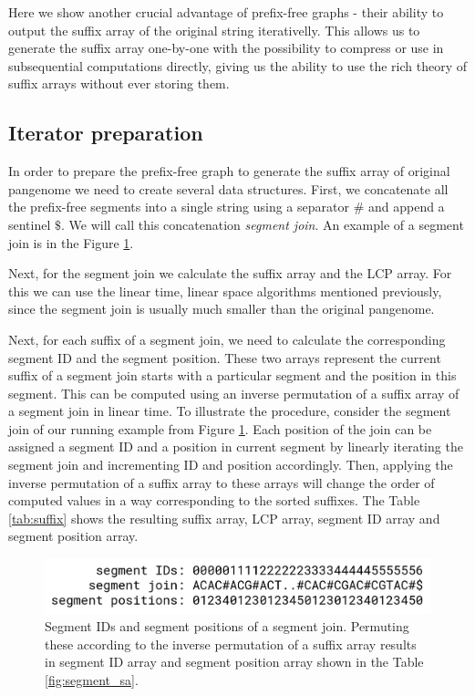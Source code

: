 \documentclass[twocolumn]{ceurart}
\begin{document}
Here we show another crucial advantage of prefix-free graphs - their ability to
output the suffix array of the original string iterativelly.
This allows us to generate the suffix array one-by-one with the possibility
to compress or use in subsequential computations directly, giving us the ability
to use the rich theory of suffix arrays without ever storing them.

\subsection{Iterator preparation}
In order to prepare the prefix-free graph to generate the suffix array of
original pangenome we need to create several data structures.
First, we concatenate all the prefix-free segments into a single string using
a separator $\#$ and append a sentinel $\$$.
We will call this concatenation \emph{segment join}.
An example of a segment join is in the Figure \ref{fig:ids_and_positions}.

Next, for the segment join we calculate the suffix array and the LCP array.
For this we can use the linear time, linear space algorithms mentioned previously,
since the segment join is usually much smaller than the original pangenome.

Next, for each suffix of a segment join, we need to calculate the corresponding
segment ID and the segment position.
These two arrays represent the current suffix of a segment join starts with a
particular segment and the position in this segment.
This can be computed using an inverse permutation of a suffix array of a segment
join in linear time.
To illustrate the procedure, consider the segment join of our running example from
Figure \ref{fig:ids_and_positions}.
Each position of the join can be assigned a segment ID and a position in current
segment by linearly iterating the segment join and incrementing ID and position
accordingly.
Then, applying the inverse permutation of a suffix array to these arrays will
change the order of computed values in a way corresponding to the sorted suffixes.
The Table \ref{tab:suffix} shows the resulting suffix array, LCP array,
segment ID array and segment position array.

\begin{figure}
    \centering
    \includegraphics[width=\linewidth]{images/ids_and_positions.png}
    \caption{
        Segment IDs and segment positions of a segment join. Permuting these
        according to the inverse permutation of a suffix array results in 
        segment ID array and segment position array shown in the Table \ref{fig:segment_sa}.
    }
    \label{fig:ids_and_positions}
\end{figure}
\end{document}

